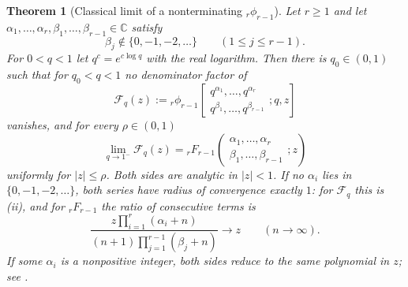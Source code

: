 \documentclass[11pt,oneside,openany]{book}
\newtheorem{theorem}{Theorem}[chapter]
\theoremstyle{definition}
\theoremstyle{remark}
\newcommand{\C}{\mathbb C}
\newcommand{\abs}[1]{\lvert #1\rvert}
\newcommand{\defeq}{\mathrel{:=}}
\begin{document}
\begin{theorem}[Classical limit of a nonterminating ${}_r\phi_{r-1}$]\label{thm:classical-hypergeometric-limit}
Let $r\ge1$ and let $\alpha_1,\dots,\alpha_r,\beta_1,\dots,\beta_{r-1}\in\C$ satisfy
\[
 \beta_j\notin\{0,-1,-2,\dots\}\qquad(1\le j\le r-1).
\]
For $0<q<1$ let $q^{c}=e^{c\log q}$ with the real logarithm.  Then there is $q_0\in(0,1)$ such that for $q_0<q<1$ no denominator factor of
\[
 \mathcal F_q(z)\defeq
 {}_r\phi_{r-1}\!\left[
 \begin{matrix}q^{\alpha_1},\dots,q^{\alpha_r}\\
               q^{\beta_1},\dots,q^{\beta_{r-1}}\end{matrix};q,z\right]
\]
vanishes, and for every $\rho\in(0,1)$
\[
 \lim_{q\to1^-}\mathcal F_q(z)
 ={}_rF_{r-1}\!\left(
 \begin{matrix}\alpha_1,\dots,\alpha_r\\ \beta_1,\dots,\beta_{r-1}\end{matrix};z\right)
\]
uniformly for $\abs z\le\rho$.  Both sides are analytic in $\abs z<1$.  If no $\alpha_i$ lies in $\{0,-1,-2,\dots\}$, both series have radius of convergence exactly $1$: for $\mathcal F_q$ this is (ii), and for ${}_rF_{r-1}$ the ratio of consecutive terms is
\[
 \frac{z\prod_{i=1}^{r}(\alpha_i+n)}{(n+1)\prod_{j=1}^{r-1}(\beta_j+n)}\longrightarrow z
 \qquad(n\to\infty).
\]
If some $\alpha_i$ is a nonpositive integer, both sides reduce to the same polynomial in $z$; see .
\end{theorem}

\end{document}
